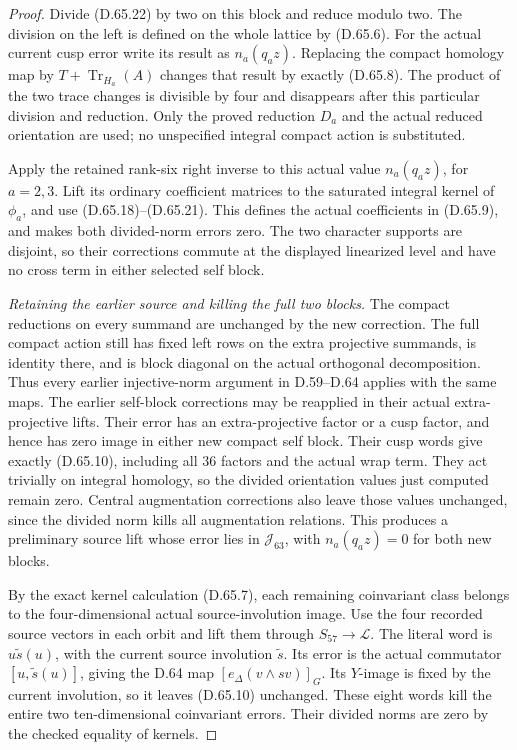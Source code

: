 \begin{proof}
Divide (D.65.22) by two on this block and reduce modulo two. The
division on the left is defined on the whole lattice by (D.65.6).
For the actual current cusp error write its result as \(n_a(q_az)\).
Replacing the compact homology map by
\(T+\operatorname{Tr}_{H_a}(A)\) changes that result by exactly
(D.65.8). The product of the two trace changes is divisible by four
and disappears after this particular division and reduction. Only
the proved reduction \(D_a\) and the actual reduced orientation are
used; no unspecified integral compact action is substituted.

Apply the retained rank-six right inverse to this actual value
\(n_a(q_az)\), for \(a=2,3\). Lift its ordinary coefficient matrices
to the saturated integral kernel of \(\phi_a\), and use
(D.65.18)--(D.65.21). This defines the actual coefficients in
(D.65.9), and makes both divided-norm errors zero. The two character
supports are disjoint, so their corrections commute at the displayed
linearized level and have no cross term in either selected self
block.

\emph{Retaining the earlier source and killing the full two blocks.}
The compact reductions on every summand are unchanged by the new
correction. The full compact action still has fixed left rows on
the extra projective summands, is identity there, and is block
diagonal on the actual orthogonal decomposition. Thus every earlier
injective-norm argument in D.59--D.64 applies with the same maps.
The earlier self-block corrections may be reapplied in their actual
extra-projective lifts. Their error has an extra-projective factor
or a cusp factor, and hence has zero image in either new compact
self block. Their cusp words give exactly (D.65.10), including all
36 factors and the actual wrap term. They act trivially on integral
homology, so the divided orientation values just computed remain
zero. Central augmentation corrections also leave those values
unchanged, since the divided norm kills all augmentation relations.
This produces a preliminary source lift whose error lies in
\(\mathcal J_{63}\), with \(n_a(q_az)=0\) for both new blocks.

By the exact kernel calculation (D.65.7), each remaining
coinvariant class belongs to the four-dimensional actual
source-involution image. Use the four recorded source vectors in
each orbit and lift them through \(S_{57}\to\mathcal L\).
The literal word is
\(u\widetilde s(u)\), with the current source involution
\(\widetilde s\). Its error is the actual commutator
\([u,\widetilde s(u)]\), giving the D.64 map
\([e_\Delta(v\wedge sv)]_G\). Its \(Y\)-image is fixed by the
current involution, so it leaves (D.65.10) unchanged. These eight
words kill the entire two ten-dimensional coinvariant errors.
Their divided norms are zero by the checked equality of kernels.


\end{proof}
